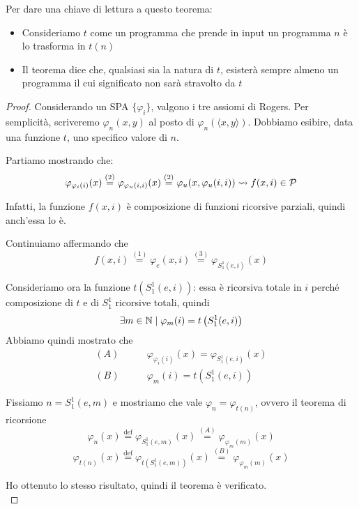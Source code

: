 Per dare una chiave di lettura a questo teorema:
\begin{itemize}
	\item Consideriamo $t$ come un programma che prende in input un programma $n$ è lo trasforma in $t(n)$
    
	\item Il teorema dice che, qualsiasi sia la natura di $t$, esisterà sempre almeno un programma il cui significato non sarà stravolto da $t$
\end{itemize}

\begin{proof}
	Considerando un SPA $\{\varphi_i\}$, valgono i tre assiomi di Rogers. Per semplicità, scriveremo $\varphi_n (x,y)$ al posto di $\varphi_n (\langle x,y \rangle)$. Dobbiamo esibire, data una funzione $t$, uno specifico valore di $n$.

	Partiamo mostrando che:
	$$ \varphi_{\varphi_i (i)} (x) \stackrel{(2)}{=} \varphi_{\varphi_u (i,i)} (x) \stackrel{(2)}{=} \varphi_u (x, \varphi_u (i,i)) \rightsquigarrow f(x,i) \in \mathcal{P} $$

	Infatti, la funzione $f(x,i)$ è composizione di funzioni ricorsive parziali, quindi anch'essa lo è.

	Continuiamo affermando che
	$$ f(x,i) \stackrel{(1)}{=} \varphi_e (x,i) \stackrel{(3)}{=} \varphi_{S_1^1 (e,i)} (x) $$

	Consideriamo ora la funzione $t\left(S_1^1 (e,i)\right)$: essa è ricorsiva totale in $i$ perché composizione di $t$ e di $S_1^1$ ricorsive totali, quindi
	$$ \exists m \in \mathbb{N} \mid \varphi_m (i) = t\left(S_1^1 (e,i)\right) $$
	Abbiamo quindi mostrato che
	\begin{align*}
		(A) \quad \quad & \varphi_{\varphi_i (i)} (x) = \varphi_{S_1^1 (e,i)} (x) \\
		(B) \quad \quad & \varphi_m (i) = t\left(S_1^1 (e,i) \right)
	\end{align*}

	Fissiamo $n = S_1^1 (e,m)$ e mostriamo che vale $\varphi_n = \varphi_{t(n)}$, ovvero il teorema di ricorsione
	$$ \varphi_n (x) \stackrel{\text{def}}{=} \varphi_{S_1^1 (e,m)} (x) \stackrel{(A)}{=} \varphi_{\varphi_m (m)} (x) $$
	$$ \varphi_{t(n)} (x) \stackrel{\text{def}}{=} \varphi_{t\left(S_1^1 (e,m)\right)} (x) \stackrel{(B)}{=} \varphi_{\varphi_m (m)} (x)$$

	Ho ottenuto lo stesso risultato, quindi il teorema è verificato.\\
\end{proof}

